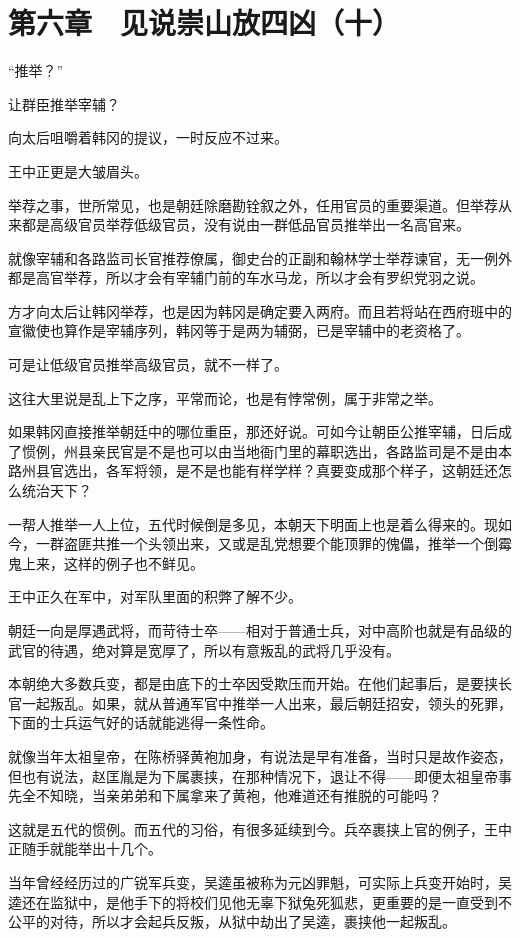 \section{第六章　见说崇山放四凶（十）}

“推举？”

让群臣推举宰辅？

向太后咀嚼着韩冈的提议，一时反应不过来。

王中正更是大皱眉头。

举荐之事，世所常见，也是朝廷除磨勘铨叙之外，任用官员的重要渠道。但举荐从来都是高级官员举荐低级官员，没有说由一群低品官员推举出一名高官来。

就像宰辅和各路监司长官推荐僚属，御史台的正副和翰林学士举荐谏官，无一例外都是高官举荐，所以才会有宰辅门前的车水马龙，所以才会有罗织党羽之说。

方才向太后让韩冈举荐，也是因为韩冈是确定要入两府。而且若将站在西府班中的宣徽使也算作是宰辅序列，韩冈等于是两为辅弼，已是宰辅中的老资格了。

可是让低级官员推举高级官员，就不一样了。

这往大里说是乱上下之序，平常而论，也是有悖常例，属于非常之举。

如果韩冈直接推举朝廷中的哪位重臣，那还好说。可如今让朝臣公推宰辅，日后成了惯例，州县亲民官是不是也可以由当地衙门里的幕职选出，各路监司是不是由本路州县官选出，各军将领，是不是也能有样学样？真要变成那个样子，这朝廷还怎么统治天下？

一帮人推举一人上位，五代时候倒是多见，本朝天下明面上也是着么得来的。现如今，一群盗匪共推一个头领出来，又或是乱党想要个能顶罪的傀儡，推举一个倒霉鬼上来，这样的例子也不鲜见。

王中正久在军中，对军队里面的积弊了解不少。

朝廷一向是厚遇武将，而苛待士卒——相对于普通士兵，对中高阶也就是有品级的武官的待遇，绝对算是宽厚了，所以有意叛乱的武将几乎没有。

本朝绝大多数兵变，都是由底下的士卒因受欺压而开始。在他们起事后，是要挟长官一起叛乱。如果，就从普通军官中推举一人出来，最后朝廷招安，领头的死罪，下面的士兵运气好的话就能逃得一条性命。

就像当年太祖皇帝，在陈桥驿黄袍加身，有说法是早有准备，当时只是故作姿态，但也有说法，赵匡胤是为下属裹挟，在那种情况下，退让不得——即便太祖皇帝事先全不知晓，当亲弟弟和下属拿来了黄袍，他难道还有推脱的可能吗？

这就是五代的惯例。而五代的习俗，有很多延续到今。兵卒裹挟上官的例子，王中正随手就能举出十几个。

当年曾经经历过的广锐军兵变，吴逵虽被称为元凶罪魁，可实际上兵变开始时，吴逵还在监狱中，是他手下的将校们见他无辜下狱兔死狐悲，更重要的是一直受到不公平的对待，所以才会起兵反叛，从狱中劫出了吴逵，裹挟他一起叛乱。

